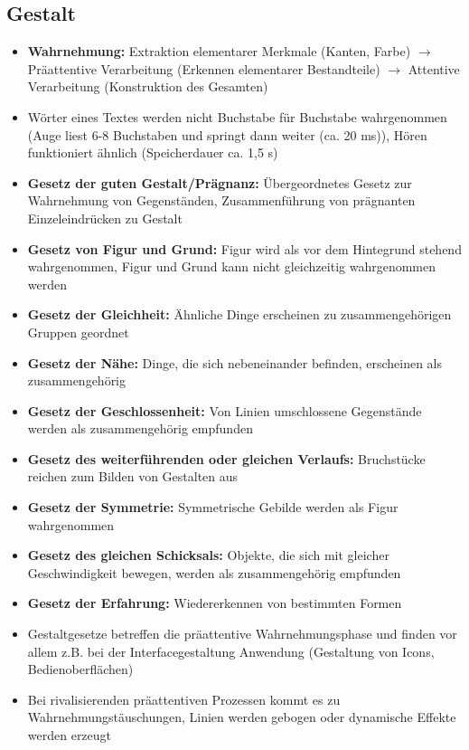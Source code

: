 \documentclass[12pt,landscape]{article}
\begin{document}
\begin{multicols}{3}
\subsection{Gestalt}
\begin{itemize}
\item \textbf{Wahrnehmung:} Extraktion elementarer Merkmale (Kanten, Farbe) $\rightarrow$ Präattentive Verarbeitung (Erkennen elementarer Bestandteile) $\rightarrow$ Attentive Verarbeitung (Konstruktion des Gesamten)
\item Wörter eines Textes werden nicht Buchstabe für Buchstabe wahrgenommen (Auge liest 6-8 Buchstaben und springt dann weiter (ca. 20 ms)), Hören funktioniert ähnlich (Speicherdauer ca. 1,5 s)
\item \textbf{Gesetz der guten Gestalt/Prägnanz:} Übergeordnetes Gesetz zur Wahrnehmung von Gegenständen, Zusammenführung von prägnanten Einzeleindrücken zu Gestalt
\item \textbf{Gesetz von Figur und Grund:} Figur wird als vor dem Hintegrund stehend wahrgenommen, Figur und Grund kann nicht gleichzeitig wahrgenommen werden
\item \textbf{Gesetz der Gleichheit:} Ähnliche Dinge erscheinen zu zusammengehörigen Gruppen geordnet
\item \textbf{Gesetz der Nähe:} Dinge, die sich nebeneinander befinden, erscheinen als zusammengehörig
\item \textbf{Gesetz der Geschlossenheit:} Von Linien umschlossene Gegenstände werden als zusammengehörig empfunden
\item \textbf{Gesetz des weiterführenden oder gleichen Verlaufs:} Bruchstücke reichen zum Bilden von Gestalten aus
\item \textbf{Gesetz der Symmetrie:} Symmetrische Gebilde werden als Figur wahrgenommen
\item \textbf{Gesetz des gleichen Schicksals:} Objekte, die sich mit gleicher Geschwindigkeit bewegen, werden als zusammengehörig empfunden
\item \textbf{Gesetz der Erfahrung:} Wiedererkennen von bestimmten Formen
\item Gestaltgesetze betreffen die präattentive Wahrnehmungsphase und finden vor allem z.B. bei der Interfacegestaltung Anwendung (Gestaltung von Icons, Bedienoberflächen)
\item Bei rivalisierenden präattentiven Prozessen kommt es zu Wahrnehmungstäuschungen, Linien werden gebogen oder dynamische Effekte werden erzeugt
\end{itemize}

\end{multicols}
\end{document}
